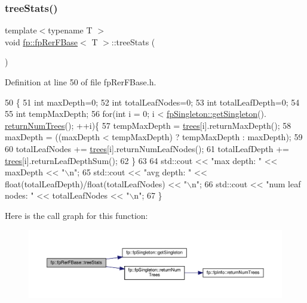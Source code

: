 \subsubsection{\texorpdfstring{tree\+Stats()}{treeStats()}}
{\footnotesize\ttfamily template$<$typename T $>$ \\
void \hyperlink{classfp_1_1fpRerFBase}{fp\+::fp\+Rer\+F\+Base}$<$ T $>$\+::tree\+Stats (\begin{DoxyParamCaption}{ }\end{DoxyParamCaption})\hspace{0.3cm}{\ttfamily [inline]}}



Definition at line 50 of file fp\+Rer\+F\+Base.\+h.


\begin{DoxyCode}
50                             \{
51                 \textcolor{keywordtype}{int} maxDepth=0;
52                 \textcolor{keywordtype}{int} totalLeafNodes=0;
53                 \textcolor{keywordtype}{int} totalLeafDepth=0;
54 
55                 \textcolor{keywordtype}{int} tempMaxDepth;
56                 \textcolor{keywordflow}{for}(\textcolor{keywordtype}{int} i = 0; i < \hyperlink{classfp_1_1fpSingleton_a8bdae77b68521003e3fc630edec2e240}{fpSingleton::getSingleton}().
      \hyperlink{classfp_1_1fpSingleton_a8be36616345b6b77ce4c60b99cc2b91c}{returnNumTrees}(); ++i)\{
57                     tempMaxDepth = \hyperlink{classfp_1_1fpRerFBase_a6c2f12312e64e5234fc53741f1bfbe96}{trees}[i].returnMaxDepth();
58                     maxDepth = ((maxDepth < tempMaxDepth) ? tempMaxDepth : maxDepth);
59 
60                     totalLeafNodes += \hyperlink{classfp_1_1fpRerFBase_a6c2f12312e64e5234fc53741f1bfbe96}{trees}[i].returnNumLeafNodes();
61                     totalLeafDepth += \hyperlink{classfp_1_1fpRerFBase_a6c2f12312e64e5234fc53741f1bfbe96}{trees}[i].returnLeafDepthSum();
62                 \}
63 
64                 std::cout << \textcolor{stringliteral}{"max depth: "} << maxDepth << \textcolor{stringliteral}{"\(\backslash\)n"};
65                 std::cout << \textcolor{stringliteral}{"avg depth: "} << float(totalLeafDepth)/float(totalLeafNodes) << \textcolor{stringliteral}{"\(\backslash\)n"};
66                 std::cout << \textcolor{stringliteral}{"num leaf nodes: "} << totalLeafNodes << \textcolor{stringliteral}{"\(\backslash\)n"};
67             \}
\end{DoxyCode}
Here is the call graph for this function\+:
\nopagebreak
\begin{figure}[H]
\begin{center}
\leavevmode
\includegraphics[width=350pt]{classfp_1_1fpRerFBase_ad9983abf38c0cb799ed490129508d42e_cgraph}
\end{center}
\end{figure}


